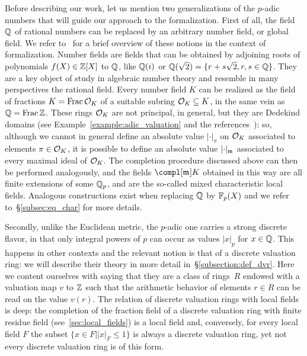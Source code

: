 \documentclass[sigplan,10pt,anonymous,review]{acmart}
\begin{document}
Before describing our work, let us mention two generalizations of the $p$-adic numbers that will guide our approach to the formalization. First of all, the field $\mathbb{Q}$ of rational numbers can be replaced by an arbitrary number field, or global field. We refer to~\cite[\S2]{BaaDahNarNuc22} for a brief overview of these notions in the context of formalization. Number fields are fields that can be obtained by adjoining roots of polynomials $f(X)\in\mathbb{Z}[X]$ to $\mathbb{Q}$, like $\mathbb{Q}(i)$ or $\mathbb{Q}(\sqrt{2})=\{r+s\sqrt{2}, r,s\in\mathbb{Q}\}$. They are a key object of study in algebraic number theory and resemble in many perspectives the rational field. Every number field $K$ can be realized as the field of fractions $K=\operatorname{Frac}{\mathcal{O}_{K}}$ of a suitable subring $\mathcal{O}_{K}\subseteq K$, in the same vein as $\mathbb{Q}=\operatorname{Frac}{\mathbb{Z}}$. These rings $\mathcal{O}_{K}$ are not principal, in general, but they are Dedekind domains (see Example~\ref{example:adic_valuation} and the references~\ibid): so, although we cannot in general define an absolute value $\lvert\cdot\rvert_\pi$ on $\mathcal{O}_{K}$ associated to elements $\pi\in\mathcal{O}_{K}$, it is possible to define an absolute value $\lvert\cdot\rvert_{\maxid[\empty]}$ associated to every maximal ideal of $\mathcal{O}_{K}$. The completion procedure discussed above can then be performed analogously, and the fields $\compl[{\maxid[\empty]}]{K}$ obtained in this way are all finite extensions of some $\mathbb{Q}_p$, and are the so-called mixed characteristic local fields. Analogous constructions exist when replacing $\mathbb{Q}$ by $\mathbb{F}_{p}(X)$ and we refer to~\S\ref{subsec:eq_char} for more details.

Secondly, unlike the Euclidean metric, the $p$-adic one carries a strong discrete flavor, in that only integral powers of $p$ can occur as values $\lvert x\rvert_p$ for $x\in\mathbb{Q}$. This happens in other contexts and the relevant notion is that of a discrete valuation ring: we will describe their theory in more detail in~\S\ref{subsection:def_dvr}. Here we content ourselves with saying that they are a class of rings~$R$ endowed with a valuation map $v$ to $\mathbb{Z}$ such that the arithmetic behavior of elements $r\in R$ can be read on the value $v(r)$. The relation of discrete valuation rings with local fields is deep: the completion of the fraction field of a discrete valuation ring with finite residue field (see~\ref{sec:local_fields}) is a local field and, conversely, for every local field $F$ the subset $\{x \in F \vert \lvert x\rvert_F\leq 1\}$ is always a discrete valuation ring, yet not every discrete valuation ring is of this form.
\end{document}
